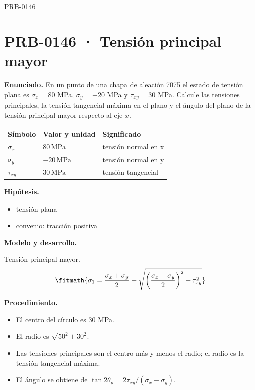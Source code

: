\begin{studiumworked}{PRB-0146}

\section{PRB-0146 · Tensión principal mayor}

\textbf{Enunciado.} En un punto de una chapa de aleación 7075 el estado de tensión plana es $\sigma_x = 80$ MPa, $\sigma_y = -20$ MPa y $\tau_{xy} = 30$ MPa. Calcule las tensiones principales, la tensión tangencial máxima en el plano y el ángulo del plano de la tensión principal mayor respecto al eje $x$.

\par\medskip\noindent\begin{tabular}{@{}p{.18\linewidth}p{.26\linewidth}p{.48\linewidth}@{}}
\toprule Símbolo & Valor y unidad & Significado\\\midrule
$\sigma_{x}$ & $80\,\mathrm{MPa}$ & tensión normal en x\\
$\sigma_{y}$ & $-20\,\mathrm{MPa}$ & tensión normal en y\\
$\tau_{xy}$ & $30\,\mathrm{MPa}$ & tensión tangencial\\
\bottomrule\end{tabular}\par\medskip

\textbf{Hipótesis.}\begin{itemize}\item tensión plana
\item convenio: tracción positiva\end{itemize}

\textbf{Modelo y desarrollo.}

Tensión principal mayor.\[\fitmath{\sigma_1 = \frac{\sigma_x + \sigma_y}{2} + \sqrt{\left(\frac{\sigma_x - \sigma_y}{2}\right)^{2} + \tau_{xy}^{2}}}\]

\textbf{Procedimiento.}\begin{itemize}\item El centro del círculo es $30$ MPa.
\item El radio es $\sqrt{50^2 + 30^2}$.
\item Las tensiones principales son el centro más y menos el radio; el radio es la tensión tangencial máxima.
\item El ángulo se obtiene de $\tan 2\theta_p = 2\tau_{xy}/(\sigma_x - \sigma_y)$.\end{itemize}


\end{studiumworked}
